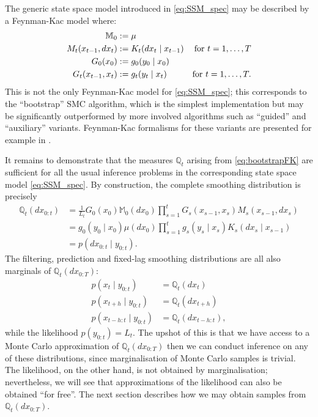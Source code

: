 The generic state space model introduced in \eqref{eq:SSM_spec} may be described by a Feynman-Kac model where:
\begin{align}
\mathbb{M}_0 &:= \mu \notag\\
M_t (x_{t-1}, dx_t) &:= K_t (dx_t \mid x_{t-1}) & \text{for } t=1,\dots,T \notag\\
G_0 (x_0) &:= g_0 ( y_0 \mid x_0 ) \notag\\
G_t (x_{t-1}, x_t) &:= g_t( y_t \mid x_t ) & \text{for } t=1,\dots,T . \label{eq:bootstrapFK}
\end{align}
This is not the only Feynman-Kac model for \eqref{eq:SSM_spec}; this corresponds to the ``bootstrap'' SMC algorithm, which is the simplest implementation but may be significantly outperformed by more involved algorithms such as ``guided''\seb{[citation]} and ``auxiliary'' \parencite{pitt1999, carpenter1999} variants. Feynman-Kac formalisms for these variants are presented for example in \textcite[Section 5.1.2]{chopin2020}.

It remains to demonstrate that the measures $\mathbb{Q}_t$ arising from \eqref{eq:bootstrapFK} are sufficient for all the usual inference problems in the corresponding state space model \eqref{eq:SSM_spec}.
By construction, the complete smoothing distribution is precisely
\begin{align*}
\mathbb{Q}_t (dx_{0:t})
&= \frac{1}{L_t} G_0(x_0) \mathbb{M}_0(dx_0)
        \prod_{s=1}^t G_s(x_{s-1}, x_s) M_s(x_{s-1}, dx_s) \\
&= g_0(y_0 \mid x_0) \mu(dx_0) 
        \prod_{s=1}^t g_s(y_s \mid x_s) K_s(dx_s \mid x_{s-1}) \\
&= p(dx_{0:t} \mid y_{0:t}) .
\end{align*}
The filtering, prediction and fixed-lag smoothing distributions are all also marginals of $\mathbb{Q}_t(dx_{0:T})$:
\begin{align*}
p(x_t \mid y_{0:t}) &= \mathbb{Q}_t (dx_t) \\
p(x_{t+h} \mid y_{0:t}) &= \mathbb{Q}_t (dx_{t+h}) \\
p(x_{t-h:t} \mid y_{0:t}) &= \mathbb{Q}_t (dx_{t-h:t}) ,
\end{align*}
while the likelihood $p(y_{0:t}) = L_t$.
The upshot of this is that we have access to a Monte Carlo approximation of $\mathbb{Q}_t(dx_{0:T})$ then we can conduct inference on any of these distributions, since marginalisation of Monte Carlo samples is trivial. The likelihood, on the other hand, is not obtained by marginalisation; nevertheless, we will see that approximations of the likelihood can also be obtained ``for free''. 
The next section describes how we may obtain samples from $\mathbb{Q}_t(dx_{0:T})$.




